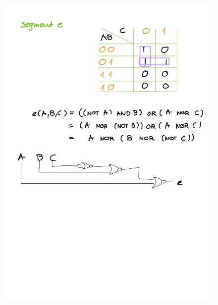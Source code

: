 \documentclass[14pt, table]{extarticle}
\begin{document}
\begin{figure}[H]
\includegraphics[scale=0.2]{Elektronika-25}
\centering
\captionsetup{labelformat=empty}
\caption{}
\end{figure}
\end{document}
